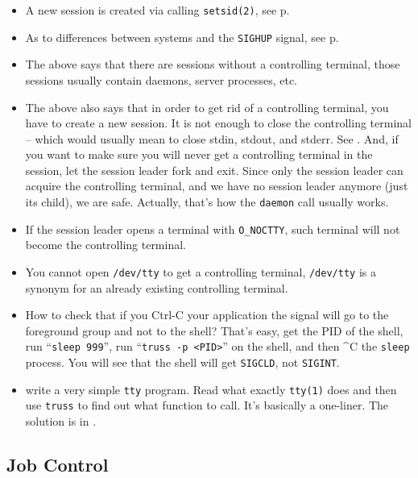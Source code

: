 \begin{itemize}
\item A new session is created via calling \texttt{setsid(2)}, see
p\pageref{SETSID}.
\item As to differences between systems and the \texttt{SIGHUP} signal, see
p\pageref{SIGHUP_SIGNAL}.
\item The above says that there are sessions without a controlling terminal,
those sessions usually contain daemons, server processes, etc.
\item The above also says that in order to get rid of a controlling terminal,
you have to create a new session. It is not enough to close the controlling
terminal -- which would usually mean to close stdin, stdout, and stderr. See
. And, if you want to make sure you will
never get a controlling terminal in the session, let the session leader fork and
exit. Since only the session leader can acquire the controlling terminal, and we
have no session leader anymore (just its child), we are safe. Actually, that's
how the \texttt{daemon} call usually works.
\item If the session leader opens a terminal with \texttt{O\_NOCTTY}, such
terminal will not become the controlling terminal.
\item You cannot open \texttt{/dev/tty} to get a controlling terminal,
\texttt{/dev/tty} is a synonym for an already existing controlling terminal.
\item How to check that if you Ctrl-C your application the signal will go to the
foreground group and not to the shell? That's easy, get the PID of the shell,
run ``\texttt{sleep 999}'', run ``\texttt{truss -p <PID>}'' on the shell, and
then \^{}C the \texttt{sleep} process. You will see that the shell will get
\texttt{SIGCLD}, not \texttt{SIGINT}.
\item {} write a very simple \texttt{tty} program. Read what
exactly \texttt{tty(1)} does and then use \texttt{truss} to find out what
function to call. It's basically a one-liner. The solution is in
.
\end{itemize}

\subsection{Job Control}

